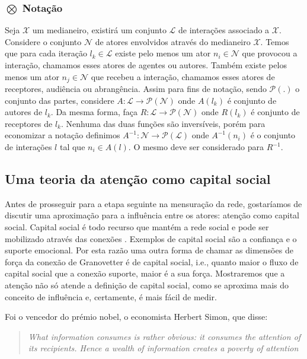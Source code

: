 \documentclass{article}
\begin{document}
\subsubsection{$\bigotimes$ Notação}

Seja $\mathscr{X}$ um medianeiro, existirá um conjunto $\mathscr{L}$ de
interações associado a $\mathscr{X}$. Considere o conjunto $\mathscr{N}$ de
atores envolvidos através do medianeiro $\mathscr{X}$. Temos que para cada
iteração $l_k \in \mathscr{L}$ existe pelo menos um ator $n_i \in \mathscr{N}$
que provocou a interação, chamamos esses atores de agentes ou autores. Também
existe pelos menos um ator $n_j \in \mathscr{N}$ que recebeu a interação,
chamamos esses atores de receptores, audiência ou abrangência. Assim para fins de
notação, sendo $\mathscr{P}(.)$ o conjunto das partes, considere
$A:\mathscr{L}\to\mathscr{P}(\mathscr{N})$ onde $A(l_k)$ é conjunto de autores de
$l_k$. Da mesma forma, faça $R:\mathscr{L}\to\mathscr{P}(\mathscr{N})$ onde
$R(l_k)$ é conjunto de receptores de $l_k$. Nenhuma das duas funções são
inversíveis, porém para economizar a notação definimos
$A^{-1}:\mathscr{N}\to\mathscr{P}(\mathscr{L})$ onde $A^{-1}(n_i)$ é o conjunto
de interações $l$ tal que $n_i \in A(l)$. O mesmo deve ser considerado para
$R^{-1}$.

\subsection{Uma teoria da atenção como capital social}

Antes de prosseguir para a etapa seguinte na mensuração da rede, gostaríamos de
discutir uma aproximação para a influência entre os atores: atenção como
capital social. Capital social é todo recurso que mantém a rede social
\cite{Coleman1988} e pode ser mobilizado através das conexões
\cite{Gyarmati2004}. Exemplos de capital social são a confiança e o suporte
emocional. Por esta razão uma outra forma de chamar as dimensões de força da
conexão de Granovetter é de capital social, i.e., quanto maior o fluxo de
capital social que a conexão suporte, maior é a sua força. Mostraremos que a
atenção não só atende a definição de capital social, como se aproxima mais do
conceito de influência e, certamente, é mais fácil de medir.

Foi o vencedor do prémio nobel, o economista Herbert Simon, que disse:

\begin{quotation}\textit{What information consumes is rather obvious: it consumes
the attention of its recipients. Hence a wealth of information creates a poverty
of attention }\cite{Simon1996}
\end{quotation}
\end{document}
